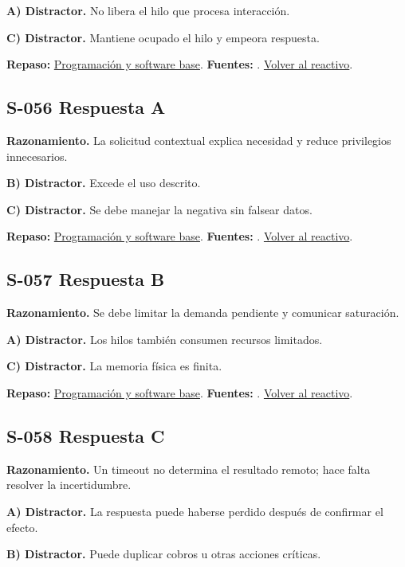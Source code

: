 \textbf{A) Distractor. }No libera el hilo que procesa interacción.

\textbf{C) Distractor. }Mantiene ocupado el hilo y empeora respuesta.

\textbf{Repaso:} \hyperref[sec:s2]{Programación y software base}. \textbf{Fuentes:} \cite{ostep,cppreference,compiler}. \hyperref[q:S-055]{Volver al reactivo}.\par\medskip

\subsection*{S-056 \quad Respuesta A}\label{s:S-056}
\textbf{Razonamiento.} La solicitud contextual explica necesidad y reduce privilegios innecesarios.

\textbf{B) Distractor. }Excede el uso descrito.

\textbf{C) Distractor. }Se debe manejar la negativa sin falsear datos.

\textbf{Repaso:} \hyperref[sec:s2]{Programación y software base}. \textbf{Fuentes:} \cite{ostep,cppreference,compiler}. \hyperref[q:S-056]{Volver al reactivo}.\par\medskip

\subsection*{S-057 \quad Respuesta B}\label{s:S-057}
\textbf{Razonamiento.} Se debe limitar la demanda pendiente y comunicar saturación.

\textbf{A) Distractor. }Los hilos también consumen recursos limitados.

\textbf{C) Distractor. }La memoria física es finita.

\textbf{Repaso:} \hyperref[sec:s2]{Programación y software base}. \textbf{Fuentes:} \cite{ostep,cppreference,compiler}. \hyperref[q:S-057]{Volver al reactivo}.\par\medskip

\subsection*{S-058 \quad Respuesta C}\label{s:S-058}
\textbf{Razonamiento.} Un timeout no determina el resultado remoto; hace falta resolver la incertidumbre.

\textbf{A) Distractor. }La respuesta puede haberse perdido después de confirmar el efecto.

\textbf{B) Distractor. }Puede duplicar cobros u otras acciones críticas.

